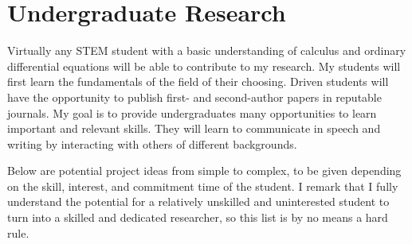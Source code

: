 \documentclass[a4paper,11pt]{article}
\begin{document}



\section{Undergraduate Research}\label{sec:undergrad}


Virtually any STEM student with a basic understanding of calculus and ordinary differential equations will be able to contribute to my research. My students will first learn the fundamentals of the field of their choosing. Driven students will have the opportunity to publish first- and second-author papers in reputable journals. My goal is to provide undergraduates many opportunities to learn important and relevant skills. They will learn to communicate in speech and writing by interacting with others of different backgrounds.

Below are potential project ideas from simple to complex, to be given depending on the skill, interest, and commitment time of the student. I remark that I fully understand the potential for a relatively unskilled and uninterested student to turn into a skilled and dedicated researcher, so this list is by no means a hard rule.
\end{document}
